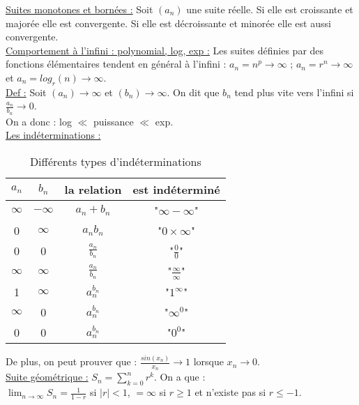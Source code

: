 \documentclass[../main.tex]{subfiles}
\begin{document}
\quad \underline{Suites monotones et bornées :} Soit $(a_n)$ une suite réelle. Si elle est croissante et majorée elle est convergente. Si elle est décroissante et minorée elle est aussi convergente.\\

\quad \underline{Comportement à l'infini : polynomial, log, exp :} Les suites définies par des fonctions élémentaires tendent en général à l'infini : $a_n = n^p \rightarrow \infty$ ; $a_n = r^n \rightarrow \infty$ et $a_n = log_r(n) \rightarrow \infty$.\\

\underline{Def :} Soit $(a_n)\rightarrow \infty$ et $(b_n)\rightarrow \infty$. On dit que $b_n$ tend plus vite vers l'infini si $\frac{a_n}{b_n} \rightarrow 0$.\\
On a donc : log $\ll$ puissance $\ll$ exp.\\

\quad \underline{Les indéterminations :}\\
\begin{table}[hbt!]
    \centering
    \begin{tabular}{c|c|c|c}
        $a_n$ & $b_n$ & la relation & est indéterminé \\
        \hline
        $\infty$ & $-\infty$ & $a_n + b_n$ & "$\infty-\infty$"\\
        \hline
        0 & $\infty$ & $a_nb_n$ & "$0\times \infty$"\\
        \hline
        0 & 0 & $\frac{a_n}{b_n}$ & "$\frac{0}{0}$"\\
        \hline
        $\infty$ & $\infty$ & $\frac{a_n}{b_n}$ & "$\frac{\infty}{\infty}$"\\
        \hline
        1 & $\infty$ & $a_n^{b_n}$ & "$1^{\infty}$"\\
        \hline
        $\infty$ & 0 & $a_n ^{b_n}$ & "$\infty^0$"\\
        \hline
        0 & 0 & $a_n^{b_n}$ & "$0^0$"\\
    \end{tabular}
    \caption{Différents types d'indéterminations}
    
\end{table}
De plus, on peut prouver que : $\frac{sin(x_n)}{x_n} \rightarrow 1$ lorsque $x_n \rightarrow 0$.\\

\quad \underline{Suite géométrique :} $S_n = \sum_{k=0}^n r^k$. On a que :\\
$\lim_{n\rightarrow \infty} S_n = \frac{1}{1-r}$ si $|r|<1$, $=\infty$ si $r \geq 1$ et n'existe pas si $r \leq -1$.\\
\end{document}
